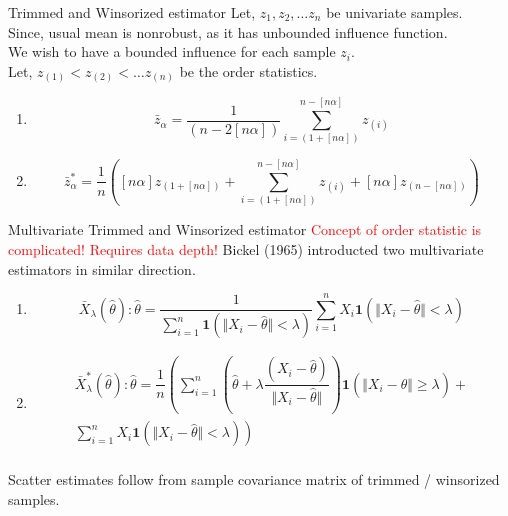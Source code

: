 \documentclass[10pt,xcolor=svgnames]{beamer} %
\newcommand{\bb}[1]{\boldsymbol{#1}}
\begin{document}
\begin{frame}{Trimmed and Winsorized estimator}
    Let, $z_1, z_2, \dots z_n$ be univariate samples.\\
    Since, usual mean is nonrobust, as it has unbounded influence function.\\
    We wish to have a bounded influence for each sample $z_i$.\\
    Let, $z_{(1)} < z_{(2)} < \dots z_{(n)}$ be the order statistics.
    \begin{enumerate}
        \item {} 
        \begin{equation*}
            \bar{z}_{\alpha} = \dfrac{1}{(n - 2[n\alpha])} \sum_{i=(1+[n\alpha ])}^{n-[n\alpha]} z_{(i)}
        \end{equation*}
        \item {}
        \begin{equation*}
            \bar{z}_{\alpha}^\ast = \dfrac{1}{n} \left( [n\alpha] z_{(1+[n\alpha])} + \sum_{i=(1+[n\alpha ])}^{n-[n\alpha]} z_{(i)} + [n\alpha] z_{(n-[n\alpha])}  \right)
        \end{equation*}
    \end{enumerate}
\end{frame}


\begin{frame}{Multivariate Trimmed and Winsorized estimator}
    \textcolor{red}{Concept of order statistic is complicated! Requires data depth!}
    Bickel (1965) introducted two multivariate estimators in similar direction.
    \begin{enumerate}
        \item {} 
        \begin{equation*}
            \bar{X}_{\lambda}(\widehat{\theta}): \widehat{\theta} = \dfrac{1}{\sum_{i=1}^n \bb{1}(\Vert X_i - \widehat{\theta} \Vert < \lambda ) } \sum_{i=1}^n X_i\bb{1}(\Vert X_i - \widehat{\theta} \Vert < \lambda )
        \end{equation*}
        \item {}
        \begin{multline*}
            \bar{X}_{\lambda}^\ast(\widehat{\theta}): \widehat{\theta} = \dfrac{1}{n} \left(  \sum_{i=1}^n \left(\widehat{\theta} + \lambda \dfrac{(X_i - \widehat{\theta})}{\Vert X_i - \widehat{\theta} \Vert }\right) \bb{1}(\Vert X_i - \widehat{\theta} \Vert \geq \lambda ) + \right. \\
            \left.  \sum_{i=1}^n X_i\bb{1}(\Vert X_i - \widehat{\theta} \Vert < \lambda ) \right) \\           
        \end{multline*}
    \end{enumerate}
    Scatter estimates follow from sample covariance matrix of trimmed / winsorized samples.
\end{frame}
\end{document}
